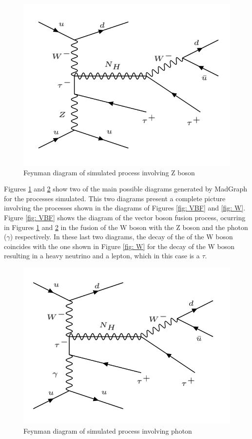 \begin{figure}[H]
\centering
\includegraphics[scale = 0.45]{Figures/Feynman_hnZ}
\caption{Feynman diagram of simulated process involving Z boson}
\label{fig: hnZ}
\end{figure}

Figures \ref{fig: hnZ} and \ref{fig: hnGamma} show two of the main possible diagrams generated by MadGraph for the processes simulated. This two diagrams present a complete picture involving the processes shown in the diagrams of Figures \ref{fig: VBF} and \ref{fig: W}. Figure \ref{fig: VBF} shows the diagram of the vector boson fusion process, ocurring in Figures \ref{fig: hnZ} and \ref{fig: hnGamma} in the fusion of the W boson with the Z boson and the photon ($\gamma$) respectively. In these last two diagrams, the decay of the of the W boson coincides with the one shown in Figure \ref{fig: W} for the decay of the W boson resulting in a heavy neutrino and a lepton, which in this case is a $\tau$.

\begin{figure}[H]
\centering
\includegraphics[scale = 0.45]{Figures/Feynman_hnGamma}
\caption{Feynman diagram of simulated process involving photon}
\label{fig: hnGamma}
\end{figure}


